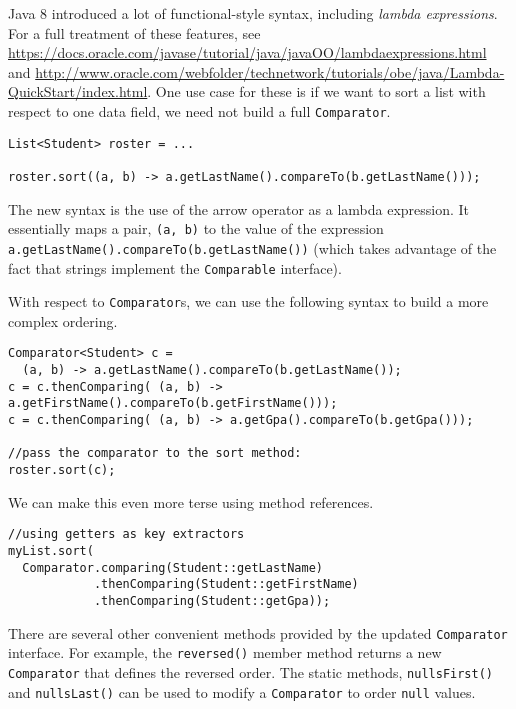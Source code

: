 Java 8 introduced a lot of functional-style syntax, including 
\emph{lambda expressions}.  For a full treatment of these features, 
see \url{https://docs.oracle.com/javase/tutorial/java/javaOO/lambdaexpressions.html} and \url{http://www.oracle.com/webfolder/technetwork/tutorials/obe/java/Lambda-QuickStart/index.html}.  One use
case for these is if we want to sort a list with respect to
one data field, we need not build a full \texttt{Comparator}.

\begin{verbatim}
List<Student> roster = ...

roster.sort((a, b) -> a.getLastName().compareTo(b.getLastName()));
\end{verbatim}

The new syntax is the use of the arrow operator as a lambda 
expression.  It essentially maps a pair, \texttt{(a, b)}
to the value of the expression 
\texttt{a.getLastName().compareTo(b.getLastName())}
(which takes advantage of the fact that strings implement the \texttt{Comparable} interface). 

With respect to \texttt{Comparator}s, we can use the following 
syntax to build a more complex ordering.

\begin{verbatim}
Comparator<Student> c = 
  (a, b) -> a.getLastName().compareTo(b.getLastName());
c = c.thenComparing( (a, b) -> a.getFirstName().compareTo(b.getFirstName()));
c = c.thenComparing( (a, b) -> a.getGpa().compareTo(b.getGpa()));

//pass the comparator to the sort method:
roster.sort(c);
\end{verbatim}

We can make this even more terse using method references.

\begin{verbatim}
//using getters as key extractors 
myList.sort(
  Comparator.comparing(Student::getLastName)
            .thenComparing(Student::getFirstName)
            .thenComparing(Student::getGpa));
\end{verbatim}

There are several other convenient methods provided by the updated
\texttt{Comparator} interface.  For example, 
the \texttt{reversed()} member method returns a new
\texttt{Comparator} that defines the reversed order.
The static methods, \texttt{nullsFirst()} and 
\texttt{nullsLast()} can be used to modify a 
\texttt{Comparator} to order \texttt{null}
values.
